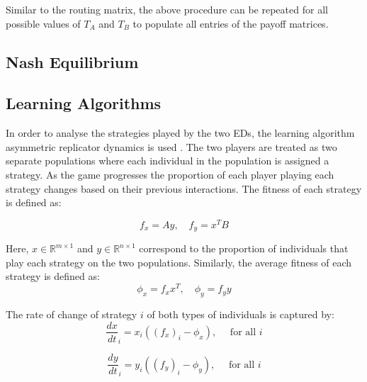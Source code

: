 Similar to the routing matrix, the above procedure can be repeated for all 
possible values of \(T_A\) and \(T_B\) to populate all entries of the payoff 
matrices. 

\subsection{Nash Equilibrium}

\subsection{Learning Algorithms}\label{sec:methodology_learning_algorithms}

In order to analyse the strategies played by the two EDs, the learning algorithm
asymmetric replicator dynamics is used \cite{asymmetricreplicatordynamics}.
The two players are treated as two separate populations where each 
individual in the population is assigned a strategy.
As the game progresses the proportion of each player playing each strategy 
changes based on their previous interactions.
The fitness of each strategy is defined as:

\begin{equation}\label{eq:asymmetric_fitness}
    f_x = Ay, \quad f_y = x^T B
\end{equation}

Here, \(x \in \mathbb{R}^{m \times 1} \) and
\(y \in \mathbb{R}^{n \times 1}\) correspond to the proportion of individuals 
that play each strategy on the two populations.
Similarly, the average fitness of each strategy is defined as:
\begin{equation}
    \phi_x = f_x x^T, \quad \phi_y = f_y y
\end{equation}

The rate of change of strategy \( i \) of both types of individuals is captured 
by:
\begin{equation}
    \frac{dx}{dt}_i = x_i((f_x)_i - \phi_x), \quad \text{ for all }i
\end{equation}

\begin{equation}
    \frac{dy}{dt}_i = y_i((f_y)_i - \phi_y), \quad \text{ for all }i
\end{equation}
 